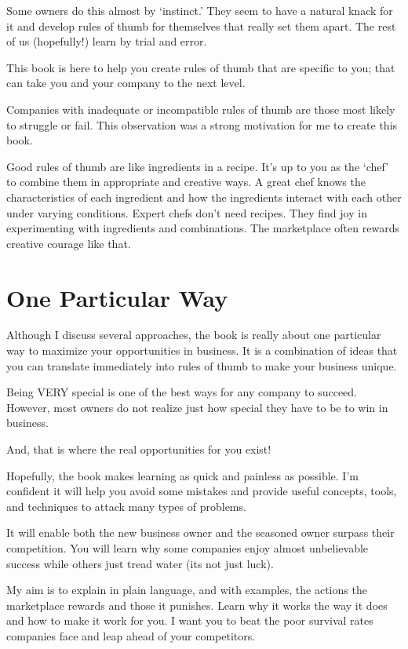 \documentclass[
]{book}
\begin{document}
Some owners do this almost by `instinct.' They seem to have a natural knack for it and develop rules of thumb for themselves that really set them apart. The rest of us (hopefully!) learn by trial and error.

This book is here to help you create rules of thumb that are specific to you; that can take you and your company to the next level.

Companies with inadequate or incompatible rules of thumb are those most likely to struggle or fail. This observation was a strong motivation for me to create this book.

Good rules of thumb are like ingredients in a recipe. It's up to you as the `chef' to combine them in appropriate and creative ways. A great chef knows the characteristics of each ingredient and how the ingredients interact with each other under varying conditions. Expert chefs don't need recipes. They find joy in experimenting with ingredients and combinations. The marketplace often rewards creative courage like that.

\hypertarget{one-particular-way}{%
\section{One Particular Way}\label{one-particular-way}}

Although I discuss several approaches, the book is really about one particular way to maximize your opportunities in business. It is a combination of ideas that you can translate immediately into rules of thumb to make your business unique.

Being VERY special is one of the best ways for any company to succeed. {However, most owners do not realize just how special they have to be to win in business.}

{And, that is where the real opportunities for you exist!}

Hopefully, the book makes learning as quick and painless as possible. I'm confident it will help you avoid some mistakes and provide useful concepts, tools, and techniques to attack many types of problems.

It will enable both the new business owner and the seasoned owner surpass their competition. You will learn why some companies enjoy almost unbelievable success while others just tread water (its not just luck).

My aim is to explain in plain language, and with examples, the actions the marketplace rewards and those it punishes. Learn why it works the way it does and how to make it work for you. I want you to beat the poor survival rates companies face and leap ahead of your competitors.
\end{document}
